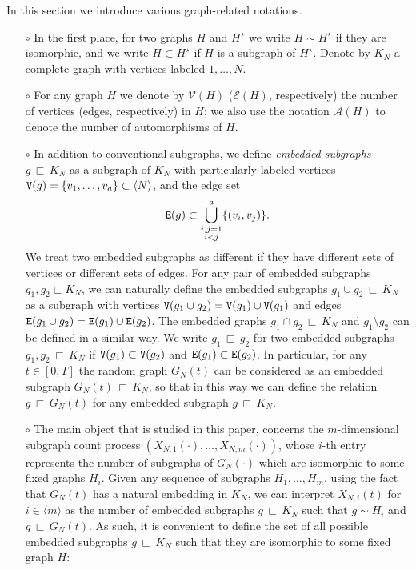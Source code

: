 \documentclass[11pt,reqno]{amsart}
\numberwithin{equation}{section}
\newcommand{\sprod}[1]{\langle#1\rangle}
\begin{document}
In this section we introduce various graph-related notations. 
\begin{itemize}
    \item[$\circ$]
In the first place, for two graphs $H$ and ${H^{\star}}$ we write ${H}\sim {H^{\star}}$ if they are {isomorphic}, and we write ${H}\subset {H^{\star}}$ if $H$ is a subgraph of ${H^{\star}} $. Denote by $K_N$ a complete graph with vertices labeled $1,\ldots,N$. 
    \item[$\circ$]
{For any graph $H$ we denote by $\mathcal{V}(H)$ ($\mathcal{E}(H)$, respectively) the number of vertices (edges, respectively) in $H$; we also use the notation $\mathcal{A}(H)$ to denote the number of automorphisms of $H$.}    
 \item[$\circ$]
In addition to conventional subgraphs, we define {\it embedded subgraphs} $g{\,\sqsubset\,} K_N$ as a subgraph of $K_N$ with particularly labeled vertices ${\tt V}(g)=\{v_1,\ldots,v_a\}\subset\sprod{N}$, and the edge set \[{\tt E}(g)\subset\bigcup_{\substack{i,j=1\\ i<j}}^{a}\{(v_i,v_j)\}.\] 
We treat two embedded subgraphs as different if they have different sets of vertices or different sets of edges. For any pair of embedded subgraphs $g_1,g_2 \sqsubset K_N$, we can naturally define the embedded subgraphs  $g_1\cup g_2{\,\sqsubset\,} K_N$ as a subgraph with vertices ${\tt V}(g_1\cup g_2) = {\tt V}(g_1)\cup{\tt V}(g_1)$ and edges ${\tt E}(g_1\cup g_2) = {\tt E}(g_1)\cup {\tt E}(g_2)$. The embedded graphs $g_1\cap g_2{\,\sqsubset\,} K_N$ and $g_1\setminus g_2$ can be defined in a similar way. We write $g_1{\,\sqsubset\,} g_2$ for two embedded subgraphs $g_1,g_2{\,\sqsubset\,} K_N$ if ${\tt V}(g_1)\subset{\tt V}(g_2)$ and ${\tt E}(g_1)\subset{\tt E}(g_2)$. {In particular, for any $t\in[0,T]$ the random graph $G_N(t)$ can be considered as an embedded subgraph $G_N(t)\,\sqsubset\, K_N$, so that in this way we can define the relation $g\,\sqsubset\, G_N(t)$ for any embedded subgraph $g\,\sqsubset\, K_N$.}
\item[$\circ$]
{The main object that is studied in this paper, concerns the $m$-dimensional subgraph count process $(X_{N,1}(\cdot),\ldots,X_{N,m}(\cdot))$, whose $i$-th entry represents the number of subgraphs of $G_N(\cdot)$ which are isomorphic to some fixed graphs $H_i$. Given any sequence of subgraphs $H_1,\ldots,H_m$, using the fact that} $G_N(t)$ has a natural embedding in $K_N$, we can interpret $X_{N,i}(t)$ for $i\in\sprod{m}$ as the number of embedded subgraphs $g {\,\sqsubset\,} K_N$ such that $g\sim {H}_i$ and $g{\,\sqsubset\,} G_N(t)$. As such, it is convenient to define the set of all possible embedded subgraphs $g{\,\sqsubset\,} K_N$ such that they are isomorphic to some fixed graph $H$: 

\end{itemize}
\end{document}
